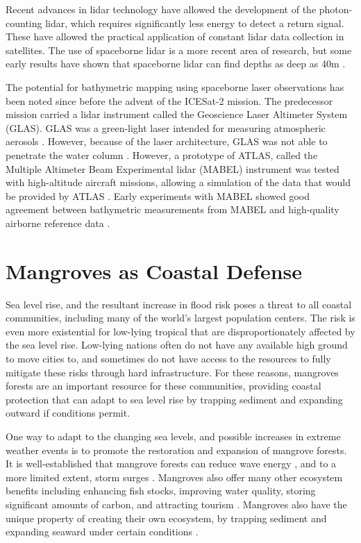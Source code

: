Recent advances in lidar technology have allowed the development of the photon-counting lidar, which requires significantly less energy to detect a return signal. These have allowed the practical application of constant lidar data collection in satellites. The use of spaceborne lidar is a more recent area of research, but some early results have shown that spaceborne lidar can find depths as deep as 40m \parencite{Parrish2019}.

The potential for bathymetric mapping using spaceborne laser observations has been noted since before the advent of the ICESat-2 mission. The predecessor mission carried a lidar instrument called the Geoscience Laser Altimeter System (GLAS). GLAS was a green-light laser intended for measuring atmospheric aerosols \parencite{Abshire2005}. However, because of the laser architecture, GLAS was not able to penetrate the water column \parencite{Forfinski-Sarkozi2016}. However, a prototype of ATLAS, called the Multiple Altimeter Beam Experimental lidar (MABEL) instrument was tested with high-altitude aircraft missions, allowing a simulation of the data that would be provided by ATLAS \parencite{Mcgill2013}. Early experiments with MABEL showed good agreement between bathymetric measurements from MABEL and high-quality airborne reference data \parencite{Jasinski2016,Forfinski-Sarkozi2016}.

\section{Mangroves as Coastal Defense}

Sea level rise, and the resultant increase in flood risk poses a threat to all coastal communities, including many of the world's largest population centers. The risk is even more existential for low-lying tropical that are disproportionately affected by the sea level rise. Low-lying nations often do not have any available high ground to move cities to, and sometimes do not have access to the resources to fully mitigate these risks through hard infrastructure. For these reasons, mangroves forests are an important resource for these communities, providing coastal protection that can adapt to sea level rise by trapping sediment and expanding outward if conditions permit.

One way to adapt to the changing sea levels, and possible increases in extreme weather events is to promote the restoration and expansion of mangrove forests. It is well-established that mangrove forests can reduce wave energy \parencite{Maza2019,Menendez2020,Hadi2003,Sanchez-Nunez2020}, and to a more limited extent, storm surges \parencite{Montgomery2019a,Chen2021,Mcivor2012}. Mangroves also offer many other ecosystem benefits including enhancing fish stocks, improving water quality, storing significant amounts of carbon, and attracting tourism \parencite{Atkinson2016b}. Mangroves also have the unique property of creating their own ecosystem, by trapping sediment and expanding seaward under certain conditions \cite{Gijsman2021}.

